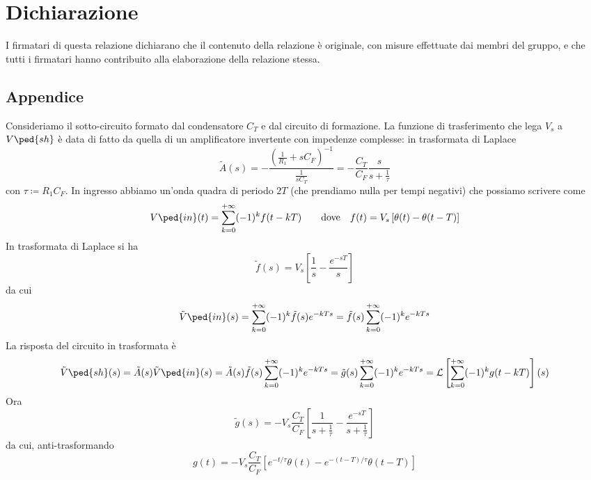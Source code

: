 \documentclass[10pt,a4paper]{article}
\begin{document}
\section*{Dichiarazione}
I firmatari di questa relazione dichiarano che il contenuto della relazione \`e
originale, con misure effettuate dai membri del gruppo, e che tutti i firmatari
hanno contribuito alla elaborazione della relazione stessa.

\newpage
\subsection*{Appendice}
Consideriamo il sotto-circuito formato dal condensatore $C_T$ e dal circuito
di formazione. La funzione di trasferimento che lega $V_s$ a $V\ped{sh}$ è
data di fatto da quella di un amplificatore invertente con impedenze
complesse: in trasformata di Laplace
\[
\tilde{A}(s) = - \frac{\left(\frac{1}{R_1} + s 
C_F\right)^{-1}}{\frac{1}{s C_T}} = - \frac{C_T}{C_F} 
\frac{s}{s + \frac{1}{\tau}}
\]
con $ \tau \coloneqq R_1 C_F $. In ingresso abbiamo un'onda quadra di 
periodo $ 2T $ (che prendiamo nulla per tempi negativi) che possiamo scrivere 
come
\[
V\ped{in}(t) = \sum_{k=0}^{+\infty} (-1)^{k}f(t - kT)
\qquad \text{dove} \quad
f(t) = V_s \left[\theta(t) - \theta(t - T)\right]
\]
In trasformata di Laplace si ha
\[
\tilde{f}(s) = V_s\left[\frac{1}{s} - \frac{e^{-sT}}{s}\right]
\]
da cui
\[
\tilde{V}\ped{in}(s) = \sum_{k=0}^{+\infty} (-1)^{k} \tilde{f}(s) e^{-kTs} = 
\tilde{f}(s) \sum_{k=0}^{+\infty} (-1)^{k} e^{-kTs}
\]
La risposta del circuito in trasformata è
\[
  \tilde{V}\ped{sh}(s) = \tilde{A}(s) \tilde{V}\ped{in}(s) =  
\tilde{A}(s)\tilde{f}(s) \sum_{k=0}^{+\infty} (-1)^{k}e^{-kTs} = \tilde{g}(s) 
\sum_{k=0}^{+\infty} (-1)^{k}e^{-kTs} = \mathcal{L}\left[\sum_{k=0}^{+\infty} 
(-1)^{k}g(t - kT)\right](s)
\]
Ora
\[
  \tilde{g}(s) = - V_s \frac{C_T}{C_F} \left[\frac{1}{s + 
\frac{1}{\tau}} - \frac{e^{-sT}}{s + \frac{1}{\tau}}\right]
\]
da cui, anti-trasformando
\[
  g(t) = - V_s \frac{C_T}{C_F} \left[e^{-t/\tau}\theta(t) - 
e^{-(t-T)/\tau} \theta(t - T) \right]
\]
\end{document}
